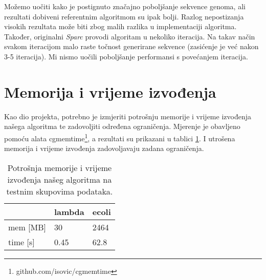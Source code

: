 Možemo uočiti kako je postignuto značajno poboljšanje sekvence genoma, ali rezultati dobiveni referentnim algoritmom su ipak bolji.
Razlog nepostizanja visokih rezultata može biti zbog malih razlika u implementaciji algoritma.
Također, originalni \emph{Sparc} provodi algoritam u nekoliko iteracija.
Na takav način svakom iteracijom malo raste točnost generirane sekvence (zasićenje je već nakon 3-5 iteracija).
Mi nismo uočili poboljšanje performansi s povećanjem iteracija.

\section{Memorija i vrijeme izvođenja}

Kao dio projekta, potrebno je izmjeriti potrošnju memorije i vrijeme izvođenja našega algoritma te zadovoljiti određena ograničenja.
Mjerenje je obavljeno pomoću alata cgmemtime\footnote{github.com/isovic/cgmemtime}, a rezultati su prikazani u tablici \ref{tbl:mem}.
I utrošena memorija i vrijeme izvođenja zadovoljavaju zadana ograničenja.

\begin{table}[]
\centering
\caption{Potrošnja memorije i vrijeme izvođenja našeg algoritma na testnim skupovima podataka.}
\label{tbl:mem}
\begin{tabular}{l|ll}
  & lambda & ecoli \\ \hline
  mem {[}MB{]} & 30     & 2464  \\
  time {[}s{]} & 0.45   & 62.8 
\end{tabular}
\end{table}

